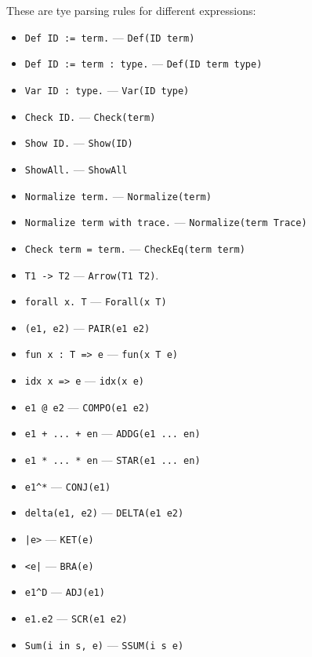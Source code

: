 \documentclass[runningheads]{llncs}
\begin{document}
These are tye parsing rules for different expressions:
\begin{itemize}
    \item \texttt{Def ID := term.} --- \texttt{Def(ID term)}
    \item \texttt{Def ID := term : type.} --- \texttt{Def(ID term type)}
    \item \texttt{Var ID : type.} --- \texttt{Var(ID type)}
    \item \texttt{Check ID.} --- \texttt{Check(term)}
    \item \texttt{Show ID.} --- \texttt{Show(ID)}
    \item \texttt{ShowAll.} --- \texttt{ShowAll}
    \item \texttt{Normalize term.} --- \texttt{Normalize(term)}
    \item \texttt{Normalize term with trace.} --- \texttt{Normalize(term Trace)}
    \item \texttt{Check term = term.} --- \texttt{CheckEq(term term)}
    \item \texttt{T1 -> T2} --- \texttt{Arrow(T1 T2)}.
    \item \texttt{forall x. T} --- \texttt{Forall(x T)}
    \item \texttt{(e1, e2)} --- \texttt{PAIR(e1 e2)}
    \item \texttt{fun x : T => e} --- \texttt{fun(x T e)}
    \item \texttt{idx x => e} --- \texttt{idx(x e)}
    \item \texttt{e1 @ e2} --- \texttt{COMPO(e1 e2)}
    \item \texttt{e1 + ... + en} --- \texttt{ADDG(e1 ... en)}
    \item \texttt{e1 * ... * en} --- \texttt{STAR(e1 ... en)}
    \item \texttt{e1\^{}*} --- \texttt{CONJ(e1)}
    \item \texttt{delta(e1, e2)} --- \texttt{DELTA(e1 e2)}
    \item \texttt{|e>} --- \texttt{KET(e)}
    \item \texttt{<e|} --- \texttt{BRA(e)}
    \item \texttt{e1\^{}D} --- \texttt{ADJ(e1)}
    \item \texttt{e1.e2} --- \texttt{SCR(e1 e2)}
    \item \texttt{Sum(i in s, e)} --- \texttt{SSUM(i s e)}
\end{itemize}
\end{document}
